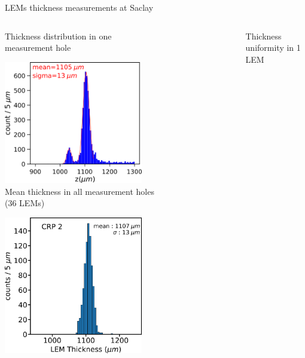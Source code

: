 \documentclass[10pt]{beamer}
\begin{document}
    \begin{frame}{LEMs thickness measurements at Saclay}
    	\begin{scriptsize}
    		\begin{columns}
    			\begin{column}{0.48\textwidth}
    				\centering
    				Thickness distribution in one \\measurement hole\\\vspace{0.1cm}
    				
    				\includegraphics[width=0.6\textwidth]{figures/666/distri_1_trou_lem.png}\\
    				\vspace{0.3cm}
    				\centering
    				Mean thickness in all measurement holes \\(36 LEMs)\\\vspace{0.1cm}
    				
    				\includegraphics[width=0.6\textwidth]{figures/666/LEM_sum_all_histo_CERN.png}
    			\end{column}
    			\hfill
    			\begin{column}{0.48\textwidth}
    				\centering
    				Thickness uniformity in 1 LEM\\\vspace{0.1cm}
    				

\end{column}
\end{columns}
\end{scriptsize}
\end{frame}
\end{document}
